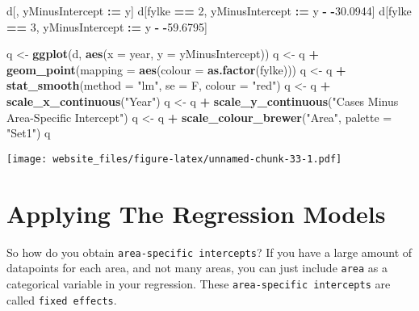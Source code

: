 \documentclass[]{book}
\newenvironment{Shaded}{\begin{snugshade}}{\end{snugshade}}
\newcommand{\KeywordTok}[1]{\textcolor[rgb]{0.13,0.29,0.53}{\textbf{#1}}}
\newcommand{\DataTypeTok}[1]{\textcolor[rgb]{0.13,0.29,0.53}{#1}}
\newcommand{\DecValTok}[1]{\textcolor[rgb]{0.00,0.00,0.81}{#1}}
\newcommand{\FloatTok}[1]{\textcolor[rgb]{0.00,0.00,0.81}{#1}}
\newcommand{\StringTok}[1]{\textcolor[rgb]{0.31,0.60,0.02}{#1}}
\newcommand{\OperatorTok}[1]{\textcolor[rgb]{0.81,0.36,0.00}{\textbf{#1}}}
\newcommand{\ErrorTok}[1]{\textcolor[rgb]{0.64,0.00,0.00}{\textbf{#1}}}
\newcommand{\NormalTok}[1]{#1}
\begin{document}
\begin{Shaded}
\begin{Highlighting}[]
\NormalTok{d[, yMinusIntercept }\OperatorTok{:}\ErrorTok{=}\StringTok{ }\NormalTok{y]}
\NormalTok{d[fylke }\OperatorTok{==}\StringTok{ }\DecValTok{2}\NormalTok{, yMinusIntercept }\OperatorTok{:}\ErrorTok{=}\StringTok{ }\NormalTok{y }\OperatorTok{-}\StringTok{ }\OperatorTok{-}\FloatTok{30.0944}\NormalTok{]}
\NormalTok{d[fylke }\OperatorTok{==}\StringTok{ }\DecValTok{3}\NormalTok{, yMinusIntercept }\OperatorTok{:}\ErrorTok{=}\StringTok{ }\NormalTok{y }\OperatorTok{-}\StringTok{ }\OperatorTok{-}\FloatTok{59.6795}\NormalTok{]}

\NormalTok{q <-}\StringTok{ }\KeywordTok{ggplot}\NormalTok{(d, }\KeywordTok{aes}\NormalTok{(}\DataTypeTok{x =}\NormalTok{ year, }\DataTypeTok{y =}\NormalTok{ yMinusIntercept))}
\NormalTok{q <-}\StringTok{ }\NormalTok{q }\OperatorTok{+}\StringTok{ }\KeywordTok{geom_point}\NormalTok{(}\DataTypeTok{mapping =} \KeywordTok{aes}\NormalTok{(}\DataTypeTok{colour =} \KeywordTok{as.factor}\NormalTok{(fylke)))}
\NormalTok{q <-}\StringTok{ }\NormalTok{q }\OperatorTok{+}\StringTok{ }\KeywordTok{stat_smooth}\NormalTok{(}\DataTypeTok{method =} \StringTok{"lm"}\NormalTok{, }\DataTypeTok{se =}\NormalTok{ F, }\DataTypeTok{colour =} \StringTok{"red"}\NormalTok{)}
\NormalTok{q <-}\StringTok{ }\NormalTok{q }\OperatorTok{+}\StringTok{ }\KeywordTok{scale_x_continuous}\NormalTok{(}\StringTok{"Year"}\NormalTok{)}
\NormalTok{q <-}\StringTok{ }\NormalTok{q }\OperatorTok{+}\StringTok{ }\KeywordTok{scale_y_continuous}\NormalTok{(}\StringTok{"Cases Minus Area-Specific Intercept"}\NormalTok{)}
\NormalTok{q <-}\StringTok{ }\NormalTok{q }\OperatorTok{+}\StringTok{ }\KeywordTok{scale_colour_brewer}\NormalTok{(}\StringTok{"Area"}\NormalTok{, }\DataTypeTok{palette =} \StringTok{"Set1"}\NormalTok{)}
\NormalTok{q}
\end{Highlighting}
\end{Shaded}

\texttt{[image: website\_files/figure-latex/unnamed-chunk-33-1.pdf]}

\section{Applying The Regression
Models}\label{applying-the-regression-models}

So how do you obtain \texttt{area-specific\ intercepts}? If you have a
large amount of datapoints for each area, and not many areas, you can
just include \texttt{area} as a categorical variable in your regression.
These \texttt{area-specific\ intercepts} are called
\texttt{fixed\ effects}.
\end{document}
